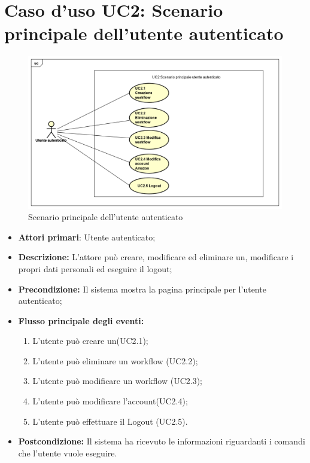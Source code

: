 \section{Caso d'uso UC2: Scenario principale dell'utente autenticato}
\begin{figure} [h]
	\centering
	\includegraphics[scale=0.4]{./Diagram/UC2.png}
	\caption{Scenario principale dell'utente autenticato }\label{}
\end{figure}
\begin{itemize}
	\item \textbf{Attori primari}: Utente autenticato;
	\item \textbf{Descrizione:} L'attore può creare, modificare ed eliminare un, modificare i propri dati personali ed eseguire il logout;
	\item \textbf{Precondizione:} Il sistema mostra la pagina principale per l'utente autenticato;
	\item \textbf{Flusso principale degli eventi:}
	\begin{enumerate}
		\item L'utente può creare un(UC2.1);
		\item L'utente può eliminare un workflow (UC2.2);
		\item L'utente può modificare un workflow (UC2.3);
		\item L'utente può modificare l'account(UC2.4);
		\item L'utente può effettuare il Logout (UC2.5).
	\end{enumerate}
	\item \textbf{Postcondizione:} Il sistema ha ricevuto le informazioni riguardanti i comandi che l'utente vuole eseguire.
\end{itemize}
